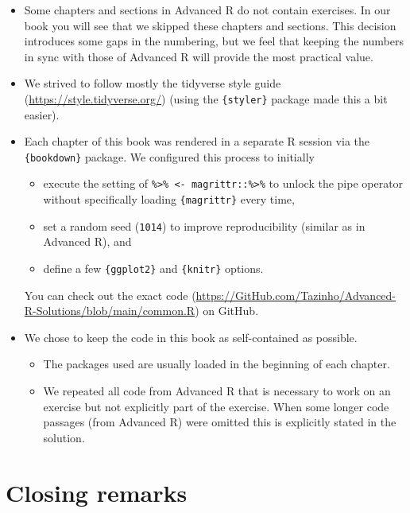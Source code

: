 \documentclass[
]{krantz}
\providecommand{\tightlist}{%
  \setlength{\itemsep}{0pt}\setlength{\parskip}{0pt}}
\renewcommand{\href}[2]{#2 (\url{#1})}
\begin{document}
\begin{itemize}
\tightlist
\item
  Some chapters and sections in Advanced R do not contain exercises. In our book you will see that we skipped these chapters and sections. This decision introduces some gaps in the numbering, but we feel that keeping the numbers in sync with those of Advanced R will provide the most practical value.
\item
  We strived to follow mostly the \href{https://style.tidyverse.org/}{tidyverse style guide} (using the \texttt{\{styler\}} package made this a bit easier).
\item
  Each chapter of this book was rendered in a separate R session via the \texttt{\{bookdown\}} package. We configured this process to initially

  \begin{itemize}
  \tightlist
  \item
    execute the setting of \texttt{\textasciigrave{}\%\textgreater{}\%\textasciigrave{}\ \textless{}-\ magrittr::\textasciigrave{}\%\textgreater{}\%\textasciigrave{}} to unlock the pipe operator without specifically loading \texttt{\{magrittr\}} every time,
  \item
    set a random seed (\texttt{1014}) to improve reproducibility (similar as in Advanced R), and
  \item
    define a few \texttt{\{ggplot2\}} and \texttt{\{knitr\}} options.
  \end{itemize}

  You can check out the \href{https://GitHub.com/Tazinho/Advanced-R-Solutions/blob/main/common.R}{exact code} on GitHub.
\item
  We chose to keep the code in this book as self-contained as possible.

  \begin{itemize}
  \tightlist
  \item
    The packages used are usually loaded in the beginning of each chapter.
  \item
    We repeated all code from Advanced R that is necessary to work on an exercise but not explicitly part of the exercise. When some longer code passages (from Advanced R) were omitted this is explicitly stated in the solution.
  \end{itemize}
\end{itemize}

\hypertarget{closing-remarks}{%
\section{Closing remarks}\label{closing-remarks}}
\end{document}
